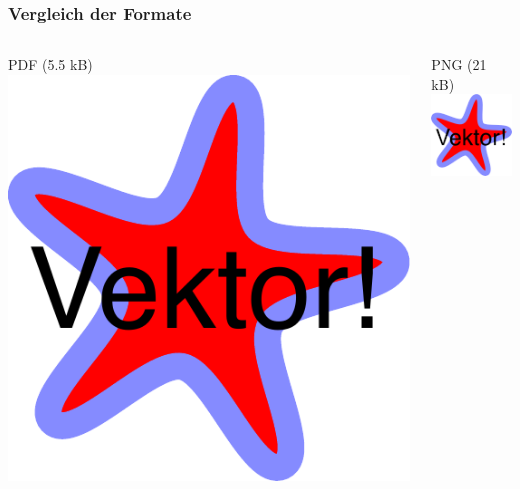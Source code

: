 \documentclass{beamer}
\begin{document}
\begin{frame}
	\frametitle{Vergleich der Formate}
	\begin{columns}[onlytextwidth]
		\begin{column}{0.33\textwidth}
		  \centering
			PDF (5.5 kB)\\[5mm]
			\includegraphics[width=\textwidth]{images/vektor.pdf}
		\end{column}
		\begin{column}{0.33\textwidth}
		  \centering
			 PNG (21 kB)\\[5mm]
			\includegraphics[width=\textwidth]{images/vektor.png}

\end{column}
\end{columns}
\end{frame}
\end{document}
